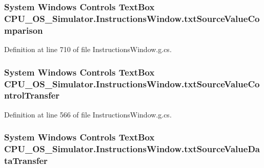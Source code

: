 \subsubsection[{txt\+Source\+Value\+Comparison}]{\setlength{\rightskip}{0pt plus 5cm}System Windows Controls Text\+Box C\+P\+U\+\_\+\+O\+S\+\_\+\+Simulator.\+Instructions\+Window.\+txt\+Source\+Value\+Comparison\hspace{0.3cm}{\ttfamily [package]}}\label{class_c_p_u___o_s___simulator_1_1_instructions_window_a8dd17881b7fd4e1923899b5bcae171fc}


Definition at line 710 of file Instructions\+Window.\+g.\+cs.

\hypertarget{class_c_p_u___o_s___simulator_1_1_instructions_window_a602831ff353007879c08b22d373a2ba5}{}
\subsubsection[{txt\+Source\+Value\+Control\+Transfer}]{\setlength{\rightskip}{0pt plus 5cm}System Windows Controls Text\+Box C\+P\+U\+\_\+\+O\+S\+\_\+\+Simulator.\+Instructions\+Window.\+txt\+Source\+Value\+Control\+Transfer\hspace{0.3cm}{\ttfamily [package]}}\label{class_c_p_u___o_s___simulator_1_1_instructions_window_a602831ff353007879c08b22d373a2ba5}


Definition at line 566 of file Instructions\+Window.\+g.\+cs.

\hypertarget{class_c_p_u___o_s___simulator_1_1_instructions_window_a44cd8a2732d939d1746051f8b2093500}{}
\subsubsection[{txt\+Source\+Value\+Data\+Transfer}]{\setlength{\rightskip}{0pt plus 5cm}System Windows Controls Text\+Box C\+P\+U\+\_\+\+O\+S\+\_\+\+Simulator.\+Instructions\+Window.\+txt\+Source\+Value\+Data\+Transfer\hspace{0.3cm}{\ttfamily [package]}}\label{class_c_p_u___o_s___simulator_1_1_instructions_window_a44cd8a2732d939d1746051f8b2093500}


